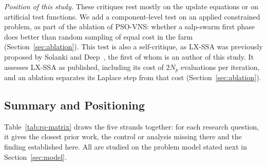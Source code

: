 \emph{Position of this study.} These critiques rest mostly on the update equations or on artificial test functions. We add a component-level test on an applied constrained problem, as part of the ablation of PSO-VNS: whether a salp-swarm first phase does better than random sampling of equal cost in the farm (Section~\ref{sec:ablation}). This test is also a self-critique, as LX-SSA was previously proposed by Solanki and Deep~\cite{Solanki2023}, the first of whom is an author of this study. It assesses LX-SSA as published, including its cost of $2N_p$ evaluations per iteration, and an ablation separates its Laplace step from that cost (Section~\ref{sec:ablation}).

\subsection{Summary and Positioning}
Table~\ref{tab:rq-matrix} draws the five strands together: for each research question, it gives the closest prior work, the control or analysis missing there and the finding established here. All are studied on the problem model stated next in Section~\ref{sec:model}.
